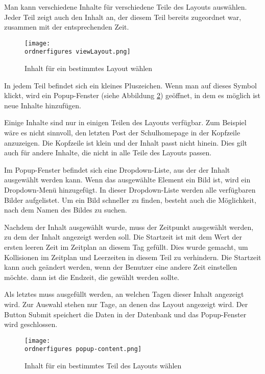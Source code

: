 Man kann verschiedene Inhalte für verschiedene Teile des Layouts auswählen.
Jeder Teil zeigt auch den Inhalt an, der diesem Teil bereits zugeordnet war, zusammen mit der entsprechenden Zeit.

\begin{figure}[H]
	\centering
	\texttt{[image: \\ordnerfigures viewLayout.png]}
	\caption{Inhalt für ein bestimmtes Layout wählen}
	\label{fi:viewLayout}
\end{figure}

In jedem Teil befindet sich ein kleines Pluszeichen. Wenn man auf dieses Symbol klickt, wird ein Popup-Fenster (siehe Abbildung \ref{fi:popup-content}) geöffnet, in dem es m\"oglich ist neue Inhalte hinzufügen.

Einige Inhalte sind nur in einigen Teilen des Layouts verfügbar. Zum Beispiel wäre es nicht sinnvoll, den letzten Post der Schulhomepage in der Kopfzeile anzuzeigen. Die Kopfzeile ist klein und der Inhalt passt nicht hinein. Dies gilt auch für andere Inhalte, die nicht in alle Teile des Layouts passen.

Im Popup-Fenster befindet sich eine Dropdown-Liste, aus der der Inhalt ausgewählt werden kann. Wenn das ausgewählte Element ein Bild ist, wird ein Dropdown-Menü hinzugefügt. In dieser Dropdown-Liste werden alle verfügbaren Bilder aufgelistet. Um ein Bild schneller zu finden, besteht auch die Möglichkeit, nach dem Namen des Bildes zu suchen.

Nachdem der Inhalt ausgewählt wurde, muss der Zeitpunkt ausgewählt werden, zu dem der Inhalt angezeigt werden soll. Die Startzeit ist mit dem Wert der ersten leeren Zeit im Zeitplan an diesem Tag gefüllt. Dies wurde gemacht, um Kollisionen im Zeitplan und Leerzeiten in diesem Teil zu verhindern. Die Startzeit kann auch geändert werden, wenn der Benutzer eine andere Zeit einstellen möchte. dann ist die Endzeit, die gewählt werden sollte.

Als letztes muss ausgefüllt werden, an welchen Tagen dieser Inhalt angezeigt wird. Zur Auswahl stehen nur Tage, an denen das Layout angezeigt wird.
Der Button Submit speichert die Daten in der Datenbank und das Popup-Fenster wird geschlossen.


\begin{figure}[H]
	\centering
	\texttt{[image: \\ordnerfigures popup-content.png]}
	\caption{Inhalt für ein bestimmtes Teil des Layouts wählen}
	\label{fi:popup-content}
\end{figure}


